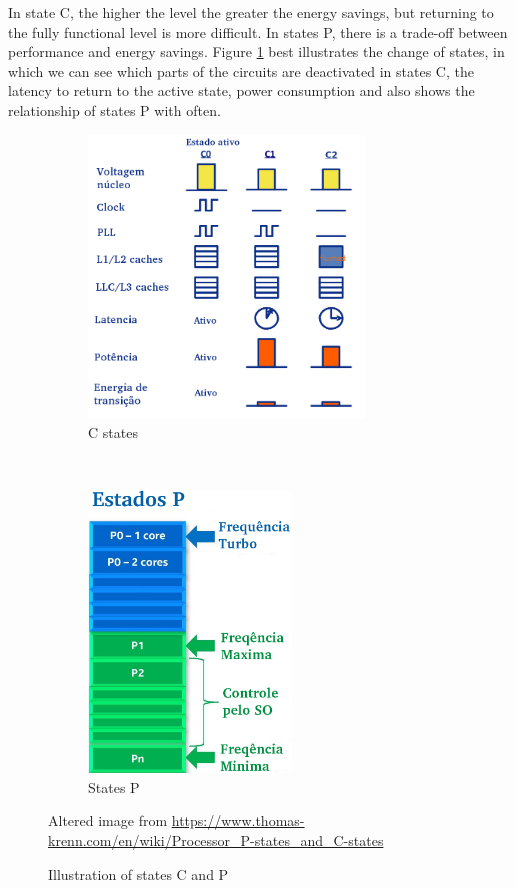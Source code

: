In state C, the higher the level the greater the energy savings, but returning to the fully functional level is more difficult. In states P, there is a trade-off between performance and energy savings. Figure \ref {fig: p_state} best illustrates the change of states, in which we can see which parts of the circuits are deactivated in states C, the latency to return to the active state, power consumption and also shows the relationship of states P with often.

\begin {figure} [H]
\centering
\begin{subfigure}[t]{0.5\textwidth}
\centering
\includegraphics[height= 7.5cm]{intro/figures/c_states}
\caption {C states}
\end {subfigure}%
~
\begin{subfigure}[t]{0.5\textwidth}
\centering
\includegraphics[height= 7.5cm]{intro/figures/p_states}
\caption {States P}
\end {subfigure}
\caption {Illustration of states C and P} {Altered image from \protect \url {https://www.thomas-krenn.com/en/wiki/Processor_P-states_and_C-states}}
\label {fig: p_state}
\end {figure}


